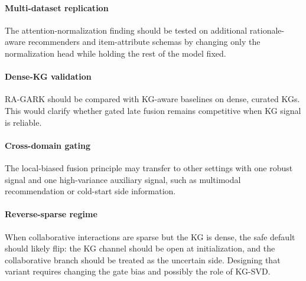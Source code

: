 \paragraph{Multi-dataset replication} The attention-normalization finding should be tested on additional rationale-aware recommenders and item-attribute schemas by changing only the normalization head while holding the rest of the model fixed.

\paragraph{Dense-KG validation} RA-GARK should be compared with KG-aware baselines on dense, curated KGs. This would clarify whether gated late fusion remains competitive when KG signal is reliable.

\paragraph{Cross-domain gating} The local-biased fusion principle may transfer to other settings with one robust signal and one high-variance auxiliary signal, such as multimodal recommendation or cold-start side information.

\paragraph{Reverse-sparse regime} When collaborative interactions are sparse but the KG is dense, the safe default should likely flip: the KG channel should be open at initialization, and the collaborative branch should be treated as the uncertain side. Designing that variant requires changing the gate bias and possibly the role of KG-SVD.
